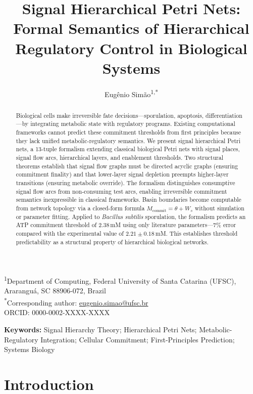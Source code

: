 \documentclass[11pt,a4paper]{article}
\title{Signal Hierarchical Petri Nets: Formal Semantics of Hierarchical Regulatory Control in Biological Systems}
\author{Eug\^enio Sim\~ao\textsuperscript{1,*}}
\date{}
\theoremstyle{plain}
\theoremstyle{definition}
\begin{document}
\maketitle

\noindent\textsuperscript{1}Department of Computing, Federal University of Santa Catarina (UFSC), Ararangu\'a, SC 88906-072, Brazil\\[2pt]
\noindent\textsuperscript{*}Corresponding author: \href{mailto:eugenio.simao@ufsc.br}{eugenio.simao@ufsc.br}\\
\noindent ORCID: 0000-0002-XXXX-XXXX %

\bigskip
\noindent\textbf{Keywords:} Signal Hierarchy Theory; Hierarchical Petri Nets; Metabolic-Regulatory Integration; Cellular Commitment; First-Principles Prediction; Systems Biology

\begin{abstract}
Biological cells make irreversible fate decisions---sporulation, apoptosis, differentiation---by integrating metabolic state with regulatory programs. Existing computational frameworks cannot predict these commitment thresholds from first principles because they lack unified metabolic-regulatory semantics. We present signal hierarchical Petri nets, a 13-tuple formalism extending classical biological Petri nets with signal places, signal flow arcs, hierarchical layers, and enablement thresholds. Two structural theorems establish that signal flow graphs must be directed acyclic graphs (ensuring commitment finality) and that lower-layer signal depletion preempts higher-layer transitions (ensuring metabolic override). The formalism distinguishes consumptive signal flow arcs from non-consuming test arcs, enabling irreversible commitment semantics inexpressible in classical frameworks. Basin boundaries become computable from network topology via a closed-form formula $M_{\mathrm{commit}} = \theta + W_s$ without simulation or parameter fitting. Applied to \textit{Bacillus subtilis} sporulation, the formalism predicts an ATP commitment threshold of 2.38\,mM using only literature parameters---7\% error compared with the experimental value of $2.21 \pm 0.18$\,mM. This establishes threshold predictability as a structural property of hierarchical biological networks.
\end{abstract}

\section{Introduction}
\end{document}

